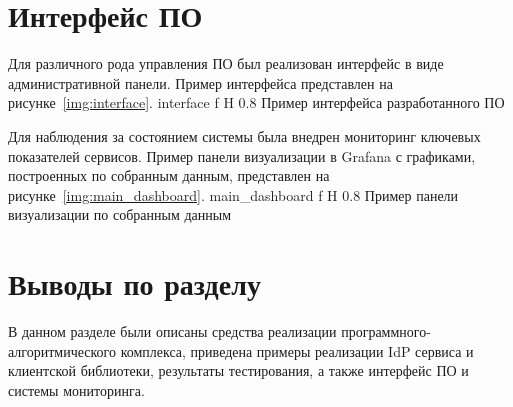 \section{Интерфейс ПО}
Для различного рода управления ПО был реализован интерфейс в виде административной панели. Пример интерфейса представлен на рисунке~\ref{img:interface}.
    {interface}
    {f}
    {H}
    {0.8\textwidth}
    {Пример интерфейса разработанного ПО}
    
Для наблюдения за состоянием системы была внедрен мониторинг ключевых показателей сервисов. Пример панели визуализации в Grafana с графиками, построенных по собранным данным, представлен на рисунке~\ref{img:main_dashboard}.
    {main_dashboard}
    {f}
    {H}
    {0.8\textwidth}
    {Пример панели визуализации по собранным данным}

\section*{Выводы по разделу}
В данном разделе были описаны средства реализации программного-алгоритмического комплекса, приведена примеры реализации IdP сервиса и клиентской библиотеки, результаты тестирования, а также интерфейс ПО и системы мониторинга.

%	
%
%
